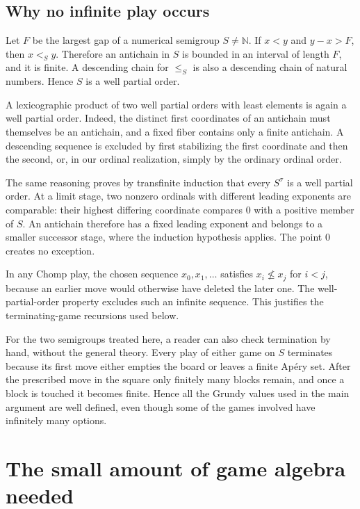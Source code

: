 \documentclass[11pt,letterpaper]{article}
\numberwithin{equation}{section}
\theoremstyle{definition}
\theoremstyle{remark}
\newcommand{\N}{\mathbb N}
\begin{document}
\subsection{Why no infinite play occurs}

Let $F$ be the largest gap of a numerical semigroup $S\ne\N$. If
$x<y$ and $y-x>F$, then $x<_S y$. Therefore an antichain in $S$ is
bounded in an interval of length $F$, and it is finite. A descending
chain for $\leq_S$ is also a descending chain of natural numbers.
Hence $S$ is a well partial order.

A lexicographic product of two well partial orders with least elements
is again a well partial order. Indeed, the distinct first coordinates
of an antichain must themselves be an antichain, and a fixed fiber
contains only a finite antichain. A descending sequence is excluded
by first stabilizing the first coordinate and then the second, or,
in our ordinal realization, simply by the ordinary ordinal order.

The same reasoning proves by transfinite induction that every
$S^\sigma$ is a well partial order. At a limit stage, two nonzero
ordinals with different leading exponents are comparable: their
highest differing coordinate compares 0 with a positive member of
$S$. An antichain therefore has a fixed leading exponent and belongs
to a smaller successor stage, where the induction hypothesis applies.
The point 0 creates no exception.

In any Chomp play, the chosen sequence $x_0,x_1,\ldots$ satisfies
$x_i\not\leq x_j$ for $i<j$, because an earlier move would otherwise
have deleted the later one. The well-partial-order property excludes
such an infinite sequence. This justifies the terminating-game
recursions used below.

For the two semigroups treated here, a reader can also check termination
by hand, without the general theory. Every play of either game on $S$
terminates because its first move either empties the board or leaves a
finite Ap\'ery set. After the prescribed move in the square only finitely
many blocks remain, and once a block is touched it becomes finite. Hence
all the Grundy values used in the main argument are well defined, even
though some of the games involved have infinitely many options.

\section{The small amount of game algebra needed}\label{sec:algebra}
\end{document}
